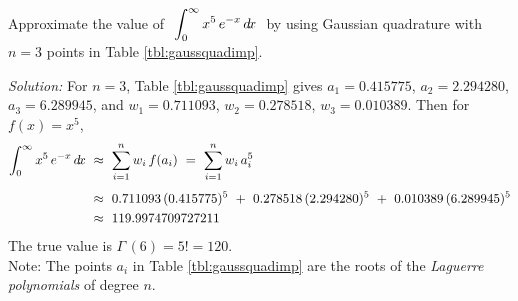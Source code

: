 \newpage
\begin{exmp}\label{exmp:gqinf}
\noindent Approximate the value of
$~\displaystyle\int_0^{\infty} x^5\,e^{-x}\,d\!x~$ by using Gaussian quadrature
with $n=3$ points in Table \ref{tbl:gaussquadimp}.\vspace{1mm}
\par\noindent\emph{Solution:} For $n=3$, Table \ref{tbl:gaussquadimp} gives
$a_1=0.415775$, $a_2=2.294280$, $a_3=6.289945$, and
$w_1=0.711093$, $w_2=0.278518$, $w_3=0.010389$. Then for $f(x)=x^5$,
\begin{align*}
\int_0^{\infty} x^5\,e^{-x}\,d\!x ~&\approx~ \sum_{i=1}^n w_i\,f(a_i) ~=~ \sum_{i=1}^n w_i\,a_i^5\\[4pt]
&\approx~ 0.711093\,(0.415775)^5 ~+~ 0.278518\,(2.294280)^5 ~+~ 0.010389\,(6.289945)^5\\
&\approx~ 119.9974709727211
\end{align*}
The true value is $\Gamma\,(6) = 5! = 120$.\\
Note: The points $a_i$ in Table \ref{tbl:gaussquadimp} are the roots of the
\emph{Laguerre polynomials} of degree $n$.
\end{exmp}\vspace{-2mm}
\divider
\vspace{3mm}
\startexercises\label{sec6dot6}
